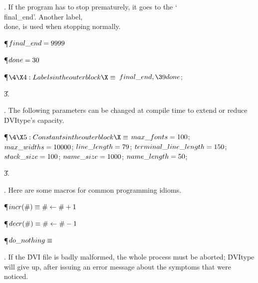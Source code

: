 . If the program has to stop prematurely, it goes to the
`\\{final\_end}'. Another label, \\{done}, is used when stopping normally.

\Y\P\D {}$\\{final\_end}=9999$\par
\P\D {}$\\{done}=30$\par
\Y\P$\4\X4:Labels in the outer block\X\S$\6
$\\{final\_end},\39\\{done}$;\par
\U3.\fi

. The following parameters can be changed at compile time to extend or
reduce \.{DVItype}'s capacity.

\Y\P$\4\X5:Constants in the outer block\X\S$\6
$\\{max\_fonts}=100$;\6
$\\{max\_widths}=10000$;\6
$\\{line\_length}=79$;\6
$\\{terminal\_line\_length}=150$;\6
$\\{stack\_size}=100$;\6
$\\{name\_size}=1000$;\6
$\\{name\_length}=50$;\par
\U3.\fi

. Here are some macros for common programming idioms.

\Y\P\D {}$\\{incr}(\#)\S\#\K\#+1$\par
\P\D {}$\\{decr}(\#)\S\#\K\#-1$\par
\P\D {}$\\{do\_nothing}\S$\par
\fi

. If the \.{DVI} file is badly malformed, the whole process must be aborted;
\.{DVItype} will give up, after issuing an error message about the symptoms
that were noticed.

